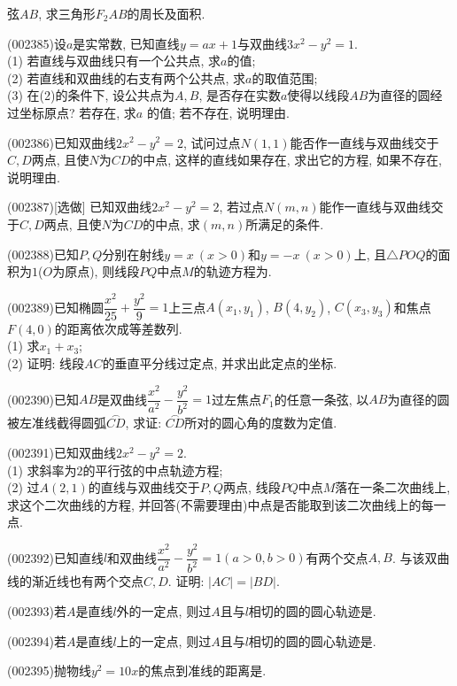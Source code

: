 弦$AB$, 求三角形${{F}_{2}}AB$的周长及面积.
\item (002385)设$a$是实常数, 已知直线$y=ax+1$与双曲线$3x^2-y^2=1$.\\ 
(1) 若直线与双曲线只有一个公共点, 求$a$的值;\\ 
(2) 若直线和双曲线的右支有两个公共点, 求$a$的取值范围;\\ 
(3) 在(2)的条件下, 设公共点为$A,B$, 是否存在实数$a$使得以线段$AB$为直径的圆经过坐标原点? 若存在, 求$a$ 的值; 若不存在, 说明理由.
\item (002386)已知双曲线$2x^2-y^2=2$, 试问过点$N(1,1)$能否作一直线与双曲线交于$C,D$两点, 且使$N$为$CD$的中点, 这样的直线如果存在, 求出它的方程, 如果不存在, 说明理由.
\item (002387)[选做]
已知双曲线$2x^2-y^2=2$, 若过点$N(m,n)$能作一直线与双曲线交于$C,D$两点, 且使$N$为$CD$的中点,
求$(m,n)$所满足的条件.
\item (002388)已知$P,Q$分别在射线$y=x \ (x>0)$和$y=-x \ (x>0)$上, 且$\triangle POQ$的面积为$1$($O$为原点), 则线段$PQ$中点$M$的轨迹方程为.
\item (002389)已知椭圆$\dfrac{x^2}{25}+\dfrac{y^2}{9}=1$上三点$A(x_1,y_1)$, $B(4,y_2)$, $C(x_3,y_3)$和焦点$F(4,0)$的距离依次成等差数列.\\ 
(1) 求$x_1+x_3$;\\ 
(2) 证明: 线段$AC$的垂直平分线过定点, 并求出此定点的坐标.
\item (002390)已知$AB$是双曲线$\dfrac{x^2}{a^2}-\dfrac{y^2}{b^2}=1$过左焦点$F_1$的任意一条弦, 以$AB$为直径的圆被左准线截得圆弧$\overset\frown{CD}$, 求证: $\overset\frown{CD}$所对的圆心角的度数为定值.
\item (002391)已知双曲线$2x^2-y^2=2$.\\ 
(1) 求斜率为$2$的平行弦的中点轨迹方程;\\ 
(2) 过$A(2,1)$的直线与双曲线交于$P,Q$两点, 线段$PQ$中点$M$落在一条二次曲线上, 求这个二次曲线的方程, 并回答(不需要理由)中点是否能取到该二次曲线上的每一点.
\item (002392)已知直线$l$和双曲线$\dfrac{x^2}{a^2}-\dfrac{y^2}{b^2}=1(a>0,b>0)$有两个交点$A,B$. 与该双曲线的渐近线也有两个交点$C,D$. 证明: $|AC|=|BD|$.
\item (002393)若$A$是直线$l$外的一定点, 则过$A$且与$l$相切的圆的圆心轨迹是.
\item (002394)若$A$是直线$l$上的一定点, 则过$A$且与$l$相切的圆的圆心轨迹是.
\item (002395)抛物线$y^2=10x$的焦点到准线的距离是.
